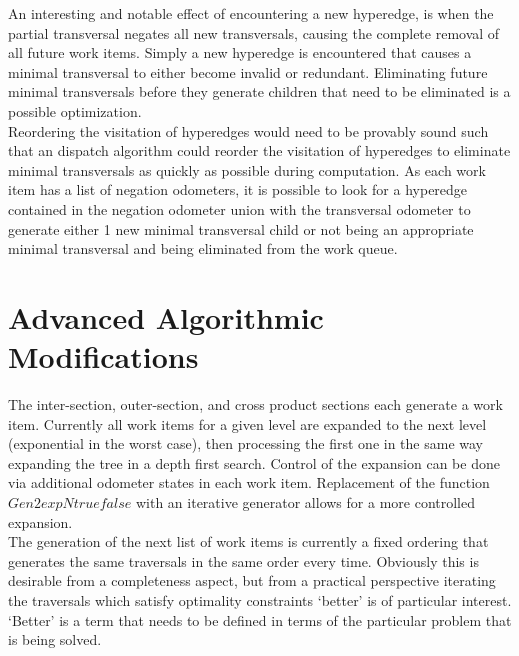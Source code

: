 An interesting and notable effect of encountering a new hyperedge, is when the partial transversal negates all new transversals, causing the complete removal of all future work items. Simply a new hyperedge is encountered that causes a minimal transversal to either become invalid or redundant. Eliminating future minimal transversals before they generate children that need to be eliminated is a possible optimization. \\

Reordering the visitation of hyperedges would need to be provably sound such that an dispatch algorithm could reorder the visitation of hyperedges to eliminate minimal transversals as quickly as possible during computation. As each work item has a list of negation odometers, it is possible to look for a hyperedge contained in the negation odometer union with the transversal odometer to generate either 1 new minimal transversal child or not being an appropriate minimal transversal and being eliminated from the work queue. \\






\section{Advanced Algorithmic Modifications}
The inter-section, outer-section, and cross product sections each generate a work item. Currently all work items for a given level are expanded to the next level (exponential in the worst case), then processing the first one in the same way expanding the tree in a depth first search. Control of the expansion can be done via additional odometer states in each work item. Replacement of the function $Gen2expNtruefalse$ with an iterative generator allows for a more controlled expansion. \\

The generation of the next list of work items is currently a fixed ordering that generates the same traversals in the same order every time. Obviously this is desirable from a completeness aspect, but from a practical perspective iterating the traversals which satisfy optimality constraints `better' is of particular interest. `Better' is a term that needs to be defined in terms of the particular problem that is being solved. \cite{khachiyan2006efficient}\\





